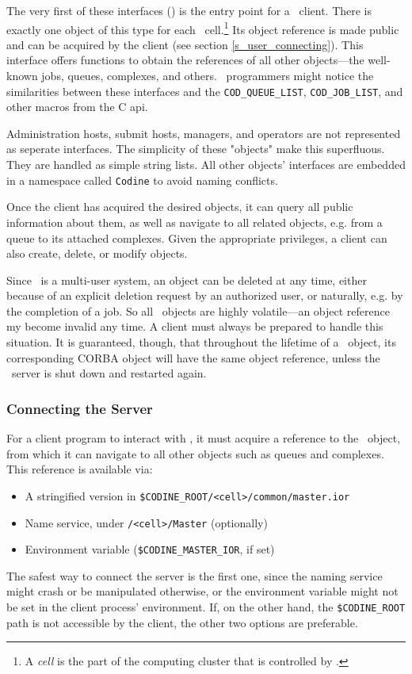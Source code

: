 The very first of these interfaces (\master) is the entry point for a \qidl\
client. There is exactly one object of this type for each \codine\ 
cell.\footnote{A \textsl{cell} is the part of the computing cluster that is
controlled by \codine.} 
Its object reference is made public and can be acquired by the client (see
section \ref{s_user_connecting}). This interface offers functions to
obtain the references of all other objects---the well-known jobs, queues,
complexes, and others. \codapi\ programmers might notice the similarities
between these interfaces and the \texttt{COD\_QUEUE\_LIST}, 
\texttt{COD\_JOB\_LIST}, and other macros from the C api.

Administration hosts, submit hosts, managers, and operators
are not represented as seperate interfaces. The simplicity of these "objects"
make this superfluous. They are handled as simple string lists.
All other objects' interfaces are embedded in a namespace called
\texttt{Codine} to avoid naming conflicts.

Once the client has acquired the desired objects, it can query all public
information about them, as well as navigate to all related objects, e.g.
from a queue to its attached complexes. Given the appropriate privileges, a
client can also create, delete, or modify objects. 

Since \codine\ is a multi-user system, an object can be deleted at any time,
either because of an explicit deletion request by an authorized user, or
naturally, e.g. by the completion of a job. So all \codine\ objects are highly
volatile---an object reference my become invalid any time. A client must
always be prepared to handle this situation. It is guaranteed, though, that
throughout the lifetime of a \emph{\codine}\ object, its corresponding CORBA
object will have the same object reference, unless the \qidl\ server is shut
down and restarted again.

\subsubsection{\label{s_user_connecting}Connecting the Server}
For a client program to interact with \qidl, it must acquire a reference to the
\master\ object, from which it can navigate to all other objects
such as queues and complexes. This reference is available via:
\begin{itemize}
\item A stringified version in
\texttt{\$CODINE\_ROOT/<cell>/common/master.ior}
\item Name service, under \texttt{/<cell>/Master} (optionally)
\item Environment variable (\texttt{\$CODINE\_MASTER\_IOR}, if set)
\end{itemize}
The safest way to connect the server is the first one, since the naming
service might crash or be manipulated otherwise, or the environment variable 
might not be set in the client process' environment. If, on the other hand, the
\texttt{\$CODINE\_ROOT} path is not accessible by the client, the other two
options are preferable.


